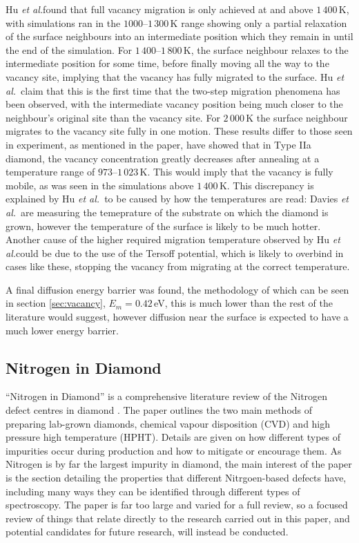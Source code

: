\documentclass[10pt,a4paper,twocolumn,twoside]{extarticle}
\newcommand{\al}{\emph{et al.}}
\begin{document}
Hu \al found that full vacancy migration is only achieved at and above $1\,400$\,K, with simulations ran in the $1000$--$1\,300$\,K range showing only a partial relaxation of the surface neighbours into an intermediate position which they remain in until the end of the simulation. For $1\,400$--$1\,800$\,K, the surface neighbour relaxes to the intermediate position for some time, before finally moving all the way to the vacancy site, implying that the vacancy has fully migrated to the surface. Hu \al~claim that this is the first time that the two-step migration phenomena has been observed, with the intermediate vacancy position being much closer to the neighbour's original site than the vacancy site. For $2\,000$\,K the surface neighbour migrates to the vacancy site fully in one motion. These results differ to those seen in experiment, as mentioned in the paper, \textcite{Davies} have showed that in Type IIa diamond, the vacancy concentration greatly decreases after annealing at a temperature range of $973$--$1\,023$\,K. This would imply that the vacancy is fully mobile, as was seen in the simulations above $1\,400$\,K. This discrepancy is explained by Hu \al~to be caused by how the temperatures are read: Davies \al~are measuring the temeprature of the substrate on which the diamond is grown, however the temperature of the surface is likely to be much hotter. Another cause of the higher required migration temperature observed by Hu \al could be due to the use of the Tersoff potential, which is likely to overbind in cases like these, stopping the vacancy from migrating at the correct temperature.

A final diffusion energy barrier was found, the methodology of which can be seen in section \ref{sec:vacancy}, $E_m = 0.42$\,eV, this is much lower than the rest of the literature would suggest, however diffusion near the surface is expected to have a much lower energy barrier.

\subsection{Nitrogen in Diamond}
``Nitrogen in Diamond'' is a comprehensive literature review of the Nitrogen defect centres in diamond \cite{NitrogeninDiamond}. 
The paper outlines the two main methods of preparing lab-grown diamonds, chemical vapour disposition (CVD) and high pressure high temperature (HPHT). Details are given on how different types of impurities occur during production and how to mitigate or encourage them. As Nitrogen is by far the largest impurity in diamond, the main interest of the paper is the section detailing the properties that different Nitrgoen-based defects have, including many ways they can be identified through different types of spectroscopy. The paper is far too large and varied for a full review, so a focused review of things that relate directly to the research carried out in this paper, and potential candidates for future research, will instead be conducted. 
\end{document}

